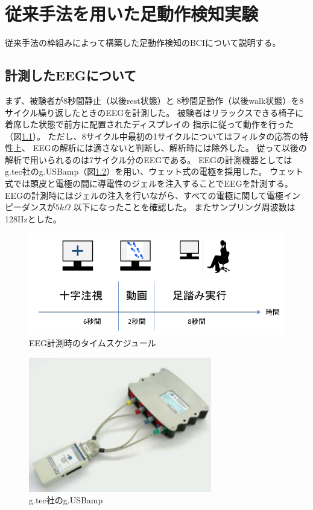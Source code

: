 \chapter{従来手法を用いた足動作検知実験}
従来手法の枠組みによって構築した足動作検知のBCIについて説明する。
\section{計測したEEGについて}
まず、被験者が8秒間静止（以後rest状態）と
8秒間足動作（以後walk状態）を8サイクル繰り返したときのEEGを計測した。
被験者はリラックスできる椅子に着席した状態で前方に配置されたディスプレイの
指示に従って動作を行った（図\ref{fig:asibumi}）。
ただし、8サイクル中最初の1サイクルについてはフィルタの応答の特性上、
EEGの解析には適さないと判断し、解析時には除外した。
従って以後の解析で用いられるのは7サイクル分のEEGである。
EEGの計測機器としてはg.tec社のg.USBamp（図\ref{fig:usbamp}）を用い、ウェット式の電極を採用した。
ウェット式では頭皮と電極の間に導電性のジェルを注入することでEEGを計測する。
EEGの計測時にはジェルの注入を行いながら、すべての電極に関して電極インピーダンスが\(5k\Omega\)
以下になったことを確認した。
またサンプリング周波数は128Hzとした。
\begin{figure}
    \centering
    \includegraphics[width=13cm]{images/asibumi.png}
    \caption{EEG計測時のタイムスケジュール}
    \label{fig:asibumi}
\end{figure}
\begin{figure}
    \centering
    \includegraphics[width=8cm]{images/usbamp.png}
    \caption{g.tec社のg.USBamp}
    \label{fig:usbamp}
\end{figure}

